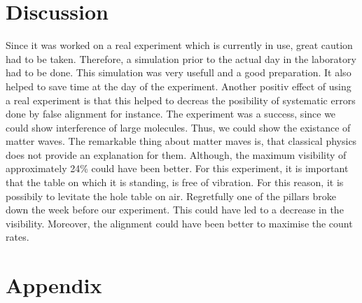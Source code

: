 \documentclass[12pt,a4paper]{article}
\begin{document}
\begin{multicols}{2}

\section{Discussion}
Since it was worked on a real experiment which is currently in use, great caution had to be taken. Therefore, a simulation prior to the actual day in the laboratory had to be done. This simulation was very usefull and a good preparation. It also helped to save time at the day of the experiment. Another positiv effect of using a real experiment is that this helped to decreas the posibility of systematic errors done by false alignment for instance.
The experiment was a success, since we could show interference of large molecules. Thus, we could show the existance of matter waves. The remarkable thing about matter maves is, that classical physics does not provide an explanation for them.  Although, the maximum visibility of approximately 24\% could have been better. 
For this experiment, it is important that the table on which it is standing, is free of vibration. For this reason, it is possibily to levitate the hole table on air. Regretfully one of the pillars broke down the week before our experiment. This could have led to a decrease in the visibility. Moreover, the alignment could have been better to maximise the count rates.

\section{Appendix}

\begin{figure}[H]
\centering
{}
\end{figure}
\end{multicols}
\end{document}

